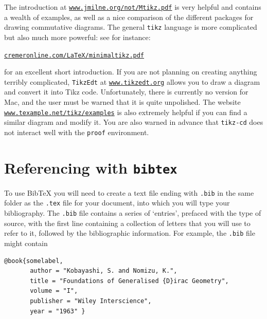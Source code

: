 \documentclass[11pt]{article}
\begin{document}
The introduction at \href{http://www.jmilne.org/not/Mtikz.pdf}{\texttt{www.jmilne.org/not/Mtikz.pdf}} is very helpful and contains a wealth of examples, as well as a nice comparison of the different packages for drawing commutative diagrams. The general \texttt{tikz} language is  more complicated but also much more powerful: see for instance:
\begin{center}
\href{http://cremeronline.com/LaTeX/minimaltikz.pdf}{\texttt{cremeronline.com/LaTeX/minimaltikz.pdf}}
\end{center}
for an excellent short introduction. If you are not planning on creating anything terribly complicated, \texttt{TikzEdt} at \href{http://www.tikzedt.org}{\texttt{www.tikzedt.org}} allows you to draw a diagram and convert it into Tikz code. Unfortunately, there is currently no version for Mac, and the user must be warned that it is quite unpolished. The website \href{http://www.texample.net/tikz/example}{\texttt{www.texample.net/tikz/examples}} is also extremely helpful if you can find a similar diagram and modify it. You are also warned in advance that \texttt{tikz-cd} does not interact well with the \texttt{proof} environment. 

\section{Referencing with \texttt{bibtex}}

To use BibTeX you will need to create a text file ending with \verb$.bib$ in the same folder as the \verb$.tex$ file for your document, into which you will type your bibliography. The \verb$.bib$ file contains a series of `entries', prefaced with the type of source, with the first line containing a collection of letters that you will use to refer to it, followed by the bibliographic information. For example, the \verb$.bib$ file might contain
\begin{verbatim}
@book{somelabel,
       author = "Kobayashi, S. and Nomizu, K.",
       title = "Foundations of Generalised {D}irac Geometry",
       volume = "I",
       publisher = "Wiley Interscience",
       year = "1963" }	
\end{verbatim}
\end{document}
